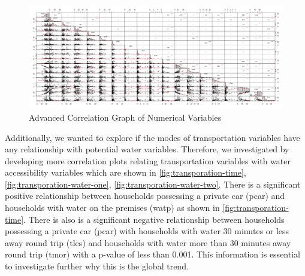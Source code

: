 \documentclass[10pt,twoside]{article}
\numberwithin{equation}{section}
\newcommand{\?}{\stackrel{?}{=}}
\begin{document}
\begin{figure}[h!]
  \centering
  \includegraphics[width=.7\textwidth]{adv-cor-plot}
  \caption{Advanced Correlation Graph of Numerical Variables}
  \label{fig:cor-plot}
\end{figure}
Additionally, we wanted to explore if the modes of transportation variables have any relationship with potential water variables. Therefore, we investigated by developing more correlation plots relating transportation variables with water accessibility variables which are shown in \autoref{fig:transporation-time}, \autoref{fig:transporation-water-one}, \autoref{fig:transporation-water-two}. There is a significant positive relationship between households possessing a private car (pcar) and households with water on the premises (watp) as shown in \autoref{fig:transporation-time}. There is also is a significant negative relationship between households possessing a private car (pcar) with households with water 30 minutes or less away round trip (tles) and households with water more than 30 minutes away round trip (tmor) with a p-value of less than 0.001. This information is essential to investigate further why this is the global trend. 
\end{document}
